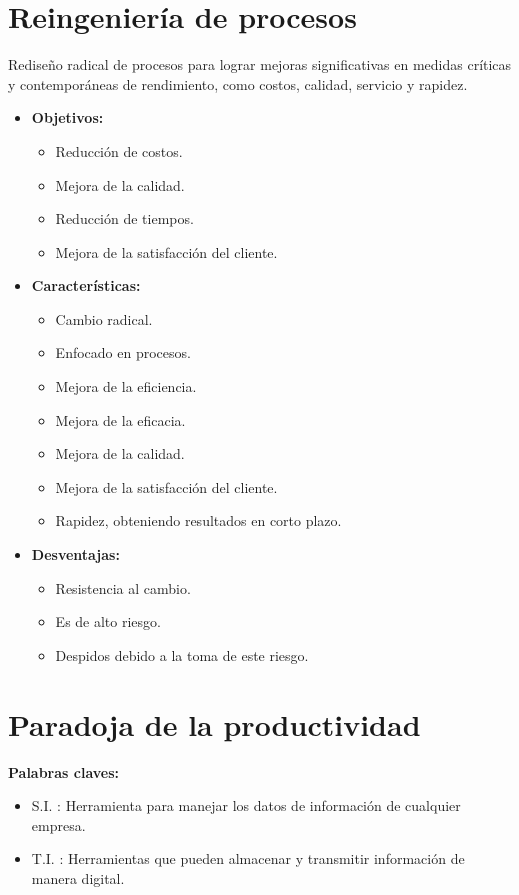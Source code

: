 \documentclass{templateNote}
\begin{document}
\section{Reingeniería de procesos}
\noindent Rediseño radical de procesos para lograr mejoras significativas en medidas críticas y contemporáneas de rendimiento, como costos, calidad, servicio y rapidez.
\begin{itemize}
    \item \textbf{Objetivos:}
    \begin{itemize}
        \item Reducción de costos.
        \item Mejora de la calidad.
        \item Reducción de tiempos.
        \item Mejora de la satisfacción del cliente.
    \end{itemize}
    \item \textbf{Características:}
    \begin{itemize}
        \item Cambio radical.
        \item Enfocado en procesos.
        \item Mejora de la eficiencia.
        \item Mejora de la eficacia.
        \item Mejora de la calidad.
        \item Mejora de la satisfacción del cliente.
        \item Rapidez, obteniendo resultados en corto plazo.
    \end{itemize}
    \item \textbf{Desventajas:}
    \begin{itemize}
        \item Resistencia al cambio.
        \item Es de alto riesgo.
        \item Despidos debido a la toma de este riesgo.
    \end{itemize}
\end{itemize}

\newpage
\section{Paradoja de la productividad}
\noindent
\textbf{Palabras claves:}
\begin{itemize}
    \item S.I. : Herramienta para manejar los datos de informaci\'on de cualquier empresa.
    \item T.I. : Herramientas que pueden almacenar y transmitir informaci\'on de manera digital.
\end{itemize}
\end{document}
